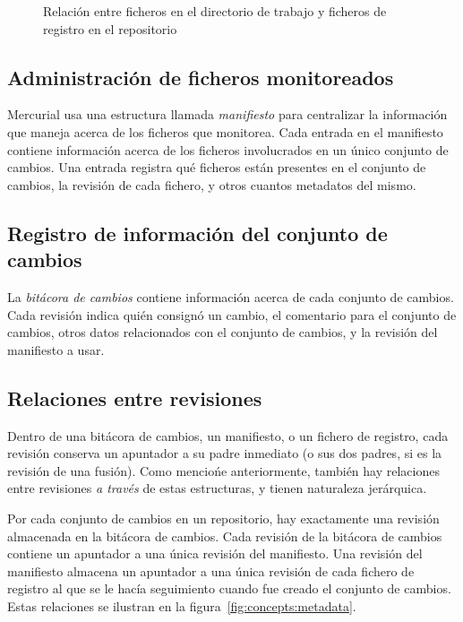\begin{figure}[ht]
  \centering
  \caption{Relación entre ficheros en el directorio de trabajo y
  ficheros de registro en el repositorio}
  \label{fig:concepts:filelog}
\end{figure}

\subsection{Administración de ficheros monitoreados}

Mercurial usa una estructura llamada \emph{manifiesto} para
centralizar la información que maneja acerca de los ficheros que
monitorea. Cada entrada en el manifiesto contiene información acerca
de los ficheros involucrados en un único conjunto de cambios. Una
entrada registra qué ficheros están presentes en el conjunto de
cambios, la revisión de cada fichero, y otros cuantos metadatos del
mismo.

\subsection{Registro de información del conjunto de cambios}

La \emph{bitácora de cambios} contiene información acerca de cada
conjunto de cambios. Cada revisión indica quién consignó un cambio, el
comentario para el conjunto de cambios, otros datos relacionados con
el conjunto de cambios, y la revisión del manifiesto a usar.

\subsection{Relaciones entre revisiones}

Dentro de una bitácora de cambios, un manifiesto, o un fichero de
registro, cada revisión conserva un apuntador a su padre inmediato
(o sus dos padres, si es la revisión de una fusión). Como menciońe
anteriormente, también hay relaciones entre revisiones \emph{a través}
de estas estructuras, y tienen naturaleza jerárquica.

Por cada conjunto de cambios en un repositorio, hay exactamente una
revisión almacenada en la bitácora de cambios. Cada revisión de la
bitácora de cambios contiene un apuntador a una única revisión del
manifiesto. Una revisión del manifiesto almacena un apuntador a una
única revisión de cada fichero de registro al que se le hacía
seguimiento cuando fue creado el conjunto de cambios. Estas relaciones
se ilustran en la figura~\ref{fig:concepts:metadata}.

